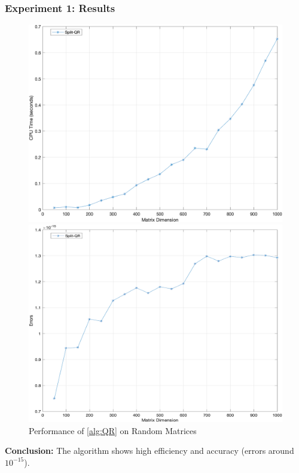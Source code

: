 \documentclass{beamer}
\begin{document}
\begin{frame}
    \frametitle{Experiment 1: Results}
    \begin{figure}[htbp]
        \centering
        \begin{minipage}[b]{0.45\textwidth}
            \centering
            \includegraphics[width=\textwidth]{images/Figure_2.png} %
        \end{minipage}
        \hfill
        \begin{minipage}[b]{0.45\textwidth}
            \centering
            \includegraphics[width=\textwidth]{images/Figure_3.png} %
        \end{minipage}
        \caption{Performance of \ref{alg:QR} on Random Matrices}
    \end{figure}
    \textbf{Conclusion:} The algorithm shows high efficiency and accuracy (errors around $10^{-15}$).
\end{frame}
\end{document}
